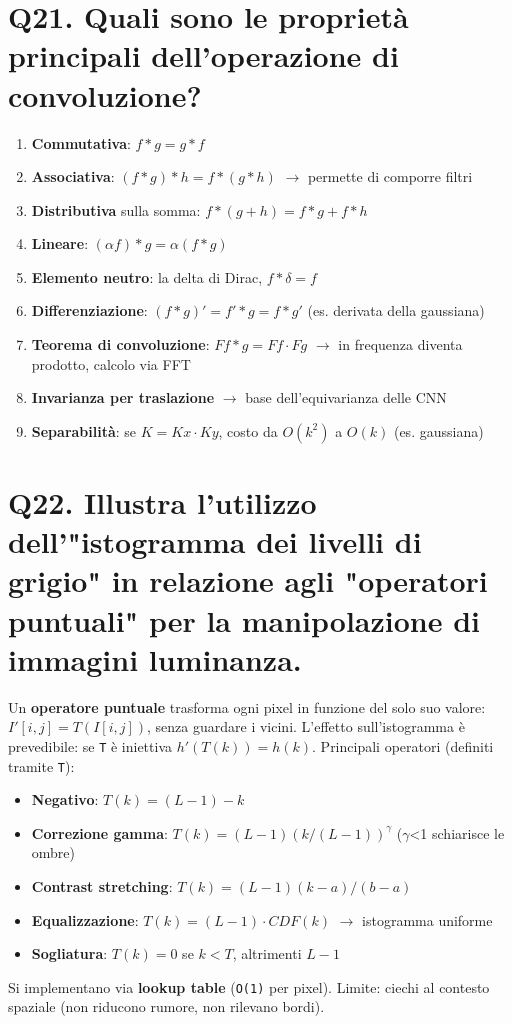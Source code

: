 \documentclass[11pt,a4paper]{article}
\begin{document}
\section*{Q21. Quali sono le proprietà principali dell'operazione di convoluzione?}
\begin{enumerate}
\item \textbf{Commutativa}: $f*g = g*f$
\item \textbf{Associativa}: $(f*g)*h = f*(g*h)$ $\to $ permette di comporre filtri
\item \textbf{Distributiva} sulla somma: $f*(g+h) = f*g + f*h$
\item \textbf{Lineare}: $(\alpha f)*g = \alpha (f*g)$
\item \textbf{Elemento neutro}: la delta di Dirac, $f*\delta  = f$
\item \textbf{Differenziazione}: $(f*g)' = f'*g = f*g'$ (es. derivata della gaussiana)
\item \textbf{Teorema di convoluzione}: $F{f*g} = F{f}\cdot F{g}$ $\to $ in frequenza diventa prodotto, calcolo via FFT
\item \textbf{Invarianza per traslazione} $\to $ base dell'equivarianza delle CNN
\item \textbf{Separabilità}: se $K = Kx\cdot Ky$, costo da $O(k^{2})$ a $O(k)$ (es. gaussiana)
\end{enumerate}
\newpage
\section*{Q22. Illustra l'utilizzo dell'"istogramma dei livelli di grigio" in relazione agli "operatori puntuali" per la manipolazione di immagini luminanza.}
Un \textbf{operatore puntuale} trasforma ogni pixel in funzione del solo suo valore: $I'[i,j] = T(I[i,j])$, senza guardare i vicini. L'effetto sull'istogramma è prevedibile: se \texttt{T} è iniettiva $h'(T(k)) = h(k)$.
Principali operatori (definiti tramite \texttt{T}):
\begin{itemize}
\item \textbf{Negativo}: $T(k) = (L-1) - k$
\item \textbf{Correzione gamma}: $T(k) = (L-1)(k/(L-1))^\gamma $ ($\gamma $<1 schiarisce le ombre)
\item \textbf{Contrast stretching}: $T(k) = (L-1)(k-a)/(b-a)$
\item \textbf{Equalizzazione}: $T(k) = (L-1)\cdot CDF(k)$ $\to $ istogramma uniforme
\item \textbf{Sogliatura}: $T(k) = 0$ se $k<T$, altrimenti $L-1$
\end{itemize}
Si implementano via \textbf{lookup table} (\texttt{O(1)} per pixel). Limite: ciechi al contesto spaziale (non riducono rumore, non rilevano bordi).
\newpage
\end{document}
